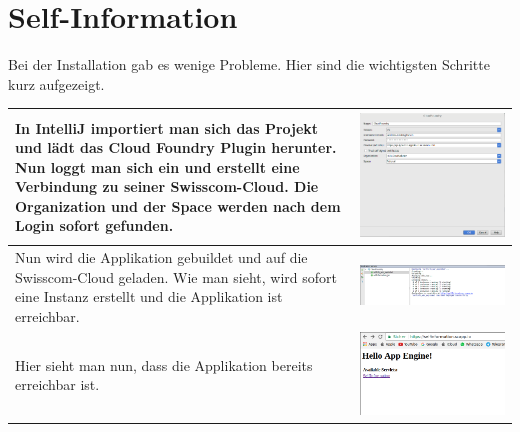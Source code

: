 \chapter{Self-Information}
Bei der Installation gab es wenige Probleme. Hier sind die wichtigsten Schritte kurz aufgezeigt.
\begin{longtable}{| p{5cm} | p{11cm} |}
\hline
In IntelliJ importiert man sich das Projekt und lädt das Cloud Foundry Plugin herunter. Nun loggt man sich ein und erstellt eine Verbindung zu seiner Swisscom-Cloud. Die Organization und der Space werden nach dem Login sofort gefunden.
&\includegraphics[width=0.65\columnwidth, valign=T]{images/cloudfoundryplugin.png}\\ \hline

Nun wird die Applikation gebuildet und auf die Swisscom-Cloud geladen. Wie man sieht, wird sofort eine Instanz erstellt und die Applikation ist erreichbar.
&\includegraphics[width=0.65\columnwidth, valign=T]{images/instanzen.png}\\ \hline


Hier sieht man nun, dass die Applikation bereits erreichbar ist.
&\includegraphics[width=0.65\columnwidth, valign=T]{images/laufendepp.png}\\ \hline
\end{longtable}
